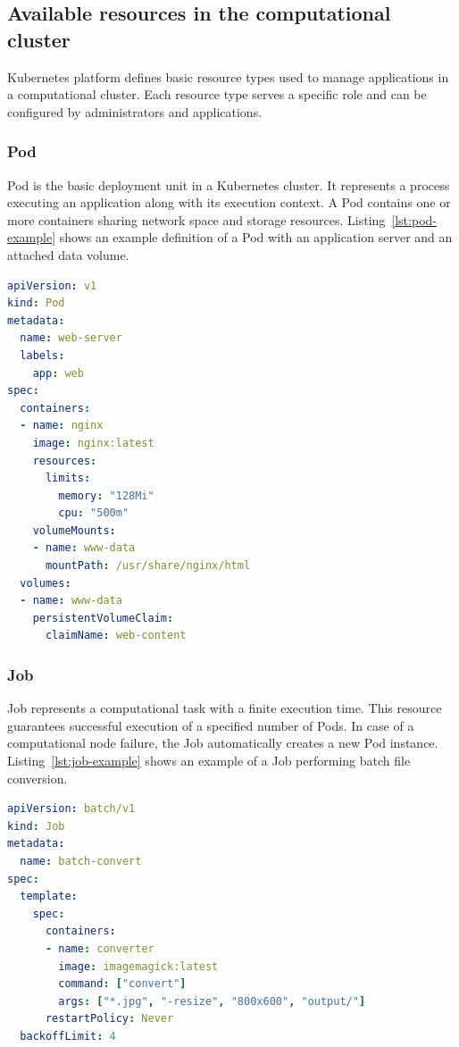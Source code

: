 \subsection{Available resources in the computational cluster}
Kubernetes platform defines basic resource types used to manage applications in a computational cluster.
Each resource type serves a specific role and can be configured by administrators and applications.

\subsubsection{Pod}
Pod is the basic deployment unit in a Kubernetes cluster.
It represents a process executing an application along with its execution context.
A Pod contains one or more containers sharing network space and storage resources.
Listing~\ref{lst:pod-example} shows an example definition of a Pod with an application server and an attached data volume.

\begin{lstlisting}[language=yaml,caption={Example Pod definition},label={lst:pod-example}]
apiVersion: v1
kind: Pod
metadata:
  name: web-server
  labels:
    app: web
spec:
  containers:
  - name: nginx
    image: nginx:latest
    resources:
      limits:
        memory: "128Mi"
        cpu: "500m"
    volumeMounts:
    - name: www-data
      mountPath: /usr/share/nginx/html
  volumes:
  - name: www-data
    persistentVolumeClaim:
      claimName: web-content
\end{lstlisting}

\subsubsection{Job}
Job represents a computational task with a finite execution time.
This resource guarantees successful execution of a specified number of Pods.
In case of a computational node failure, the Job automatically creates a new Pod instance.
Listing~\ref{lst:job-example} shows an example of a Job performing batch file conversion.

\begin{lstlisting}[language=yaml,caption={Example Job definition},label={lst:job-example}]
apiVersion: batch/v1
kind: Job
metadata:
  name: batch-convert
spec:
  template:
    spec:
      containers:
      - name: converter
        image: imagemagick:latest
        command: ["convert"]
        args: ["*.jpg", "-resize", "800x600", "output/"]
      restartPolicy: Never
  backoffLimit: 4
\end{lstlisting}

